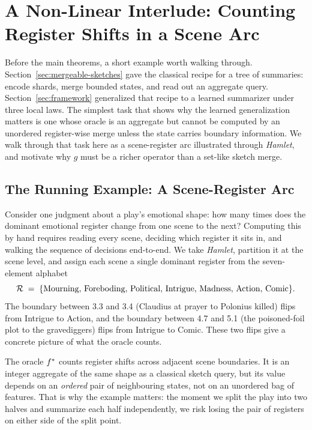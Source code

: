 \section{A Non-Linear Interlude: Counting Register Shifts in a Scene Arc}\label{sec:markov-interlude}

Before the main theorems, a short example worth walking through.
Section~\ref{sec:mergeable-sketches} gave the classical recipe for a tree
of summaries: encode shards, merge bounded states, and read out an
aggregate query. Section~\ref{sec:framework} generalized that recipe to a
learned summarizer under three local laws. The simplest task that shows
why the learned generalization matters is one whose oracle is an aggregate
but cannot be computed by an unordered register-wise merge unless the
state carries boundary information. We walk through that task here as a
scene-register arc illustrated through \emph{Hamlet}, and motivate why
$g$ must be a richer operator than a set-like sketch merge.

\subsection{The Running Example: A Scene-Register Arc}\label{sec:scene-register-example}

Consider one judgment about a play's emotional shape: how many times
does the dominant emotional register change from one scene to the
next? Computing this by hand requires reading every scene, deciding
which register it sits in, and walking the sequence of decisions
end-to-end. We take \emph{Hamlet}, partition it at the scene level,
and assign each scene a single dominant register from the
seven-element alphabet
\[
  \mathcal{R} \;=\; \{\text{Mourning},\, \text{Foreboding},\, \text{Political},\, \text{Intrigue},\, \text{Madness},\, \text{Action},\, \text{Comic}\}.
\]
The boundary between 3.3 and 3.4 (Claudius at prayer to Polonius killed)
flips from Intrigue to Action, and the boundary between 4.7 and 5.1 (the
poisoned-foil plot to the gravediggers) flips from Intrigue to Comic.
These two flips give a concrete picture of what the oracle counts.

The oracle $f^\ast$ counts register shifts across adjacent scene
boundaries. It is an integer aggregate of the same shape as a classical
sketch query, but its value depends on an \emph{ordered} pair of
neighbouring states, not on an unordered bag of features. That is why
the example matters: the moment we split the play into two halves and
summarize each half independently, we risk losing the pair of registers
on either side of the split point.

